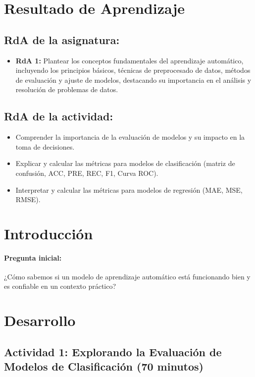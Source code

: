 \documentclass[a4,11pt]{aleph-notas}
\begin{document}
\encabezado


\section*{Resultado de Aprendizaje}

\subsection*{RdA de la asignatura:}
\begin{itemize}[leftmargin=*]
    \item \textbf{RdA 1:} 
    Plantear los conceptos fundamentales del aprendizaje automático, incluyendo los principios básicos, técnicas de preprocesado de datos, métodos de evaluación y ajuste de modelos, destacando su importancia en el análisis y resolución de problemas de datos.
\end{itemize}

\subsection*{RdA de la actividad:}
    \begin{itemize}[leftmargin=*]
        \item Comprender la importancia de la evaluación de modelos y su impacto en la toma de decisiones.
        \item Explicar y calcular las métricas para modelos de clasificación (matriz de confusión, ACC, PRE, REC, F1, Curva ROC).
        \item Interpretar y calcular las métricas para modelos de regresión (MAE, MSE, RMSE).
    \end{itemize}

\section*{Introducción}

\paragraph{Pregunta inicial:} 
¿Cómo sabemos si un modelo de aprendizaje automático está funcionando bien y es confiable en un contexto práctico?


\section*{Desarrollo}

\subsection*{Actividad 1: Explorando la Evaluación de Modelos de Clasificación (70 minutos)}
\end{document}
